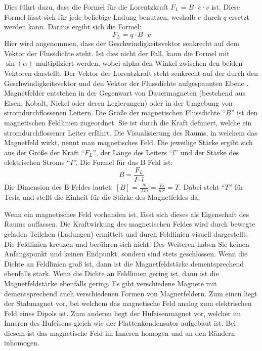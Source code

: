 Dies führt dazu, dass die Formel für die Lorentzkraft $F_L = B \cdot e \cdot v$ ist.
Diese Formel lässt sich für jede beliebige Ladung benutzen, weshalb $e$ durch $q$ ersetzt werden kann.
Daraus ergibt sich die Formel:
\begin{equation}
\label{eq:F_l1}
    F_L = q \cdot B \cdot v
\end{equation}
Hier wird angenommen, dass der Geschwindigkeitsvektor senkrecht auf dem Vektor der Flussdichte steht.
Ist dies nicht der Fall, kann die Formel mit $\sin(\alpha)$ multipliziert werden, wobei alpha den Winkel zwischen den beiden Vektoren darstellt.
Der Vektor der Lorentzkraft steht senkrecht auf der durch den Geschwindigkeitsvektor und den Vektor der Flussdichte aufgespannten Ebene \cite{Lorentzkraft}.
Magnetfelder entstehen in der Gegenwart von Dauermagneten (bestehend aus Eisen, Kobalt, Nickel oder deren Legierungen) oder in der Umgebung von stromdurchflossenen Leitern. 
Die Größe der magnetischen Flussdichte "`$B$"' ist den magnetischen Feldlinien zugeordnet.
Sie ist durch die Kraft definiert, welche ein stromdurchflossener Leiter erfährt.
Die Visualisierung des Raums, in welchem das Magnetfeld wirkt, nennt man magnetisches Feld.
Die jeweilige Stärke ergibt sich aus der Größe der Kraft "`$F_L$"', der Länge des Leiters "`$l$"' und der Stärke des elektrischen Stroms "`$I$"'.
Die Formel für das B-Feld ist:
\begin{equation}
\label{eq:B}
    B = \frac{F_L}{I \cdot l}
\end{equation}
Die Dimension des B-Feldes lautet: $[B] = \frac{N}{Am} = \frac{Vs}{m^2} = T$.
Dabei steht "`$T$"' für Tesla und stellt die Einheit für die Stärke des Magnetfeldes da.

Wenn ein magnetisches Feld vorhanden ist, lässt sich dieses als Eigenschaft des Raums auffassen.
Die Kraftwirkung des magnetischen Feldes wird durch bewegte geladen Teilchen (Ladungen) ermittelt und durch Feldlinien visuell dargestellt.
Die Feldlinien kreuzen und berühren sich nicht.
Des Weiteren haben Sie keinen Anfangspunkt und keinen Endpunkt, sondern sind stets geschlossen.
Wenn die Dichte an Feldlinien groß ist, dann ist die Magnetfeldstärke dementsprechend ebenfalls stark.
Wenn die Dichte an Feldlinien gering ist, dann ist die Magnetfeldstärke ebenfalls gering.
Es gibt verschiedene Magnete mit dementsprechend auch verschiedenen Formen von Magnetfeldern. 
Zum einen liegt der Stabmagnet vor, bei welchem das magnetische Feld analog zum elektrischen Feld eines Dipols ist.
Zum anderen liegt der Hufeisenmagnet vor, welcher im Inneren des Hufeisens gleich wie der Plattenkondensator aufgebaut ist.
Bei diesem ist das magnetische Feld im Inneren homogen und an den Rändern inhomogen. 
